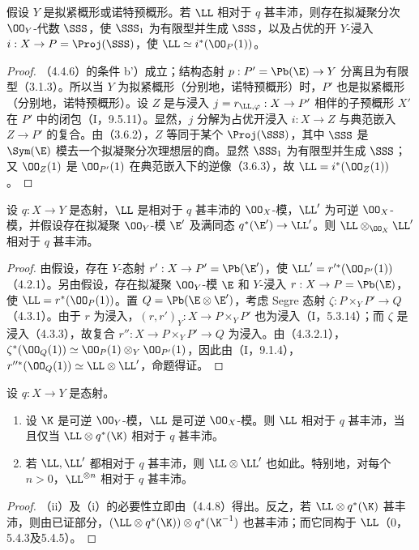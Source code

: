 假设 $Y$ 是拟紧概形或诺特预概形。若 $\LL$ 相对于 $q$ 甚丰沛，则存在拟凝聚分次 $\OO_Y$-代数 $\SSS$，使 $\SSS_1$ 为有限型并生成 $\SSS$，以及占优的开 $Y$-浸入 $i:X\to P=\Proj(\SSS)$，使 $\LL\simeq i^*(\OO_P(1))$。
\begin{proof}
（4.4.6）的条件 b'）成立；结构态射 $p:P'=\Pb(\E)\to Y$ 分离且为有限型（3.1.3）。所以当 $Y$ 为拟紧概形（分别地，诺特预概形）时，$P'$ 也是拟紧概形（分别地，诺特预概形）。设 $Z$ 是与浸入 $j=r_{\LL,\varphi}:X\to P'$ 相伴的子预概形 $X'$ 在 $P'$ 中的闭包（I，9.5.11）。显然，$j$ 分解为占优开浸入 $i:X\to Z$ 与典范嵌入 $Z\to P'$ 的复合。由（3.6.2），$Z$ 等同于某个 $\Proj(\SSS)$，其中 $\SSS$ 是 $\Sym(\E)$ 模去一个拟凝聚分次理想层的商。显然 $\SSS_1$ 为有限型并生成 $\SSS$；又 $\OO_Z(1)$ 是 $\OO_{P'}(1)$ 在典范嵌入下的逆像（3.6.3），故 $\LL=i^*(\OO_Z(1))$。
\end{proof}

设 $q:X\to Y$ 是态射，$\LL$ 是相对于 $q$ 甚丰沛的 $\OO_X$-模，$\LL'$ 为可逆 $\OO_X$-模，并假设存在拟凝聚 $\OO_Y$-模 $\E'$ 及满同态 $q^*(\E')\to\LL'$。则 $\LL\otimes_{\OO_X}\LL'$ 相对于 $q$ 甚丰沛。
\begin{proof}
由假设，存在 $Y$-态射 $r':X\to P'=\Pb(\E')$，使 $\LL'=r'^*(\OO_{P'}(1))$（4.2.1）。另由假设，存在拟凝聚 $\OO_Y$-模 $\E$ 和 $Y$-浸入 $r:X\to P=\Pb(\E)$，使 $\LL=r^*(\OO_P(1))$。置 $Q=\Pb(\E\otimes\E')$，考虑 Segre 态射 $\zeta:P\times_Y P'\to Q$（4.3.1）。由于 $r$ 为浸入，$(r,r')_Y:X\to P\times_Y P'$ 也为浸入（I，5.3.14）；而 $\zeta$ 是浸入（4.3.3），故复合 $r'':X\to P\times_Y P'\to Q$ 为浸入。由（4.3.2.1），$\zeta^*(\OO_Q(1))\simeq\OO_P(1)\otimes_Y\OO_{P'}(1)$，因此由（I，9.1.4），$r''^*(\OO_Q(1))\simeq\LL\otimes\LL'$，命题得证。
\end{proof}

设 $q:X\to Y$ 是态射。
\begin{enumerate}[label=(\roman*)]
\item 设 $\K$ 是可逆 $\OO_Y$-模，$\LL$ 是可逆 $\OO_X$-模。则 $\LL$ 相对于 $q$ 甚丰沛，当且仅当 $\LL\otimes q^*(\K)$ 相对于 $q$ 甚丰沛。
\item 若 $\LL,\LL'$ 都相对于 $q$ 甚丰沛，则 $\LL\otimes\LL'$ 也如此。特别地，对每个 $n>0$，$\LL^{\otimes n}$ 相对于 $q$ 甚丰沛。
\end{enumerate}
\begin{proof}
（ii）及（i）的必要性立即由（4.4.8）得出。反之，若 $\LL\otimes q^*(\K)$ 甚丰沛，则由已证部分，$(\LL\otimes q^*(\K))\otimes q^*(\K^{-1})$ 也甚丰沛；而它同构于 $\LL$（0，5.4.3及5.4.5）。
\end{proof}

